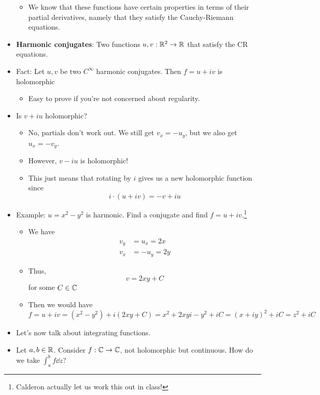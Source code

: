 \documentclass[../notes.tex]{subfiles}
\begin{document}
\begin{itemize}
\begin{itemize}
        \item We know that these functions have certain properties in terms of their partial derivatives, namely that they satisfy the Cauchy-Riemann equations.
    \end{itemize}
    \item \textbf{Harmonic conjugates}: Two functions $u,v:\mathbb{R}^2\to\mathbb{R}$ that satisfy the CR equations.
    \item Fact: Let $u,v$ be two $C^\infty$ harmonic conjugates. Then $f=u+iv$ is holomorphic
    \begin{itemize}
        \item Easy to prove if you're not concerned about regularity.
    \end{itemize}
    \item Is $v+iu$ holomorphic?
    \begin{itemize}
        \item No, partials don't work out. We still get $v_x=-u_y$, but we also get $u_x=-v_y$.
        \item However, $v-iu$ is holomorphic!
        \item This just means that rotating by $i$ gives us a new holomorphic function since
        \begin{equation*}
            i\cdot(u+iv) = -v+iu
        \end{equation*}
    \end{itemize}
    \item Example: $u=x^2-y^2$ is harmonic. Find a conjugate and find $f=u+iv$.\footnote{Calderon actually let us work this out in class!}
    \begin{itemize}
        \item We have
        \begin{align*}
            v_y &= u_x = 2x\\
            v_x &= -u_y = 2y
        \end{align*}
        \item Thus,
        \begin{equation*}
            v = 2xy+C
        \end{equation*}
        for some $C\in\mathbb{C}$
        \item Then we would have
        \begin{equation*}
            f = u+iv
            = (x^2-y^2)+i(2xy+C)
            = x^2+2xyi-y^2+iC
            = (x+iy)^2+iC
            = z^2+iC
        \end{equation*}
    \end{itemize}
    \item Let's now talk about integrating functions.
    \item Let $a,b\in\mathbb{R}$. Consider $f:\mathbb{C}\to\mathbb{C}$, not holomorphic but continuous. How do we take $\int_a^bf\dd{z}$?
    \begin{figure}[H]
        \centering
\end{figure}
\end{itemize}
\end{document}
